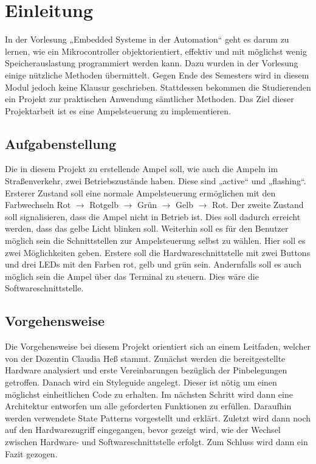\chapter{Einleitung}
In der Vorlesung „Embedded Systeme in der Automation“ geht es darum zu lernen, wie ein Mikrocontroller objektorientiert, effektiv und mit möglichst wenig Speicherauslastung programmiert werden kann. Dazu wurden in der Vorlesung einige nützliche Methoden übermittelt. Gegen Ende des Semesters wird in diesem Modul jedoch keine Klausur geschrieben. Stattdessen bekommen die Studierenden ein Projekt zur praktischen Anwendung sämtlicher Methoden. Das Ziel dieser Projektarbeit ist es eine Ampelsteuerung zu implementieren.

\section{Aufgabenstellung}
Die in diesem Projekt zu erstellende Ampel soll, wie auch die Ampeln im Straßenverkehr, zwei Betriebszustände haben. Diese sind „active“ und „flashing“. Ersterer Zustand soll eine normale Ampelsteuerung ermöglichen mit den Farbwechseln Rot $\rightarrow$ Rotgelb $\rightarrow$ Grün $\rightarrow$ Gelb $\rightarrow$ Rot. Der zweite Zustand soll signalisieren, dass die Ampel nicht in Betrieb ist. Dies soll dadurch erreicht werden, dass das gelbe Licht blinken soll. Weiterhin soll es für den Benutzer möglich sein die Schnittstellen zur Ampelsteuerung selbst zu wählen. Hier soll es zwei Möglichkeiten geben. Erstere soll die Hardwareschnittstelle mit zwei Buttons und drei LEDs mit den Farben rot, gelb und grün sein. Andernfalls soll es auch möglich sein die Ampel über das Terminal zu steuern. Dies wäre die Softwareschnittstelle.\\

\section{Vorgehensweise}

Die Vorgehensweise bei diesem Projekt orientiert sich an einem Leitfaden, welcher von der Dozentin Claudia Heß stammt. Zunächst werden die bereitgestellte Hardware analysiert und erste Vereinbarungen bezüglich der Pinbelegungen getroffen. Danach wird ein Styleguide angelegt. Dieser ist nötig um einen möglichst einheitlichen Code zu erhalten. Im nächsten Schritt wird dann eine Architektur entworfen um alle geforderten Funktionen zu erfüllen. Daraufhin werden verwendete State Patterns vorgestellt und erklärt. Zuletzt wird dann noch auf den Hardwarezugriff eingegangen, bevor gezeigt wird, wie der Wechsel zwischen Hardware- und Softwareschnittstelle erfolgt. Zum Schluss wird dann ein Fazit gezogen.

